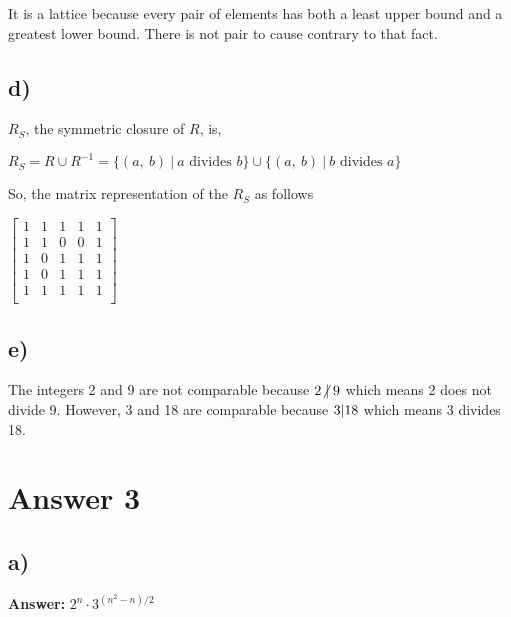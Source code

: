 \documentclass[12pt]{article}
\begin{document}
It is a lattice because every pair of elements has both a least upper bound and a greatest lower bound. There is not pair to cause contrary to that fact.

\subsection*{d)}

$R_S$, the symmetric closure of $R$, is,

$R_S = R \cup R^{-1} = \{(a,\ b)\ |\ a \text{ divides } b\} \cup \{(a,\ b)\ |\ b \text{ divides } a \}$

\noindent So, the matrix representation of the $R_S$ as follows

$\begin{bmatrix}
1 & 1 & 1 & 1 & 1\\
1 & 1 & 0 & 0 & 1\\
1 & 0 & 1 & 1 & 1\\
1 & 0 & 1 & 1 & 1\\
1 & 1 & 1 & 1 & 1\\
\end{bmatrix}$

\subsection*{e)}

The integers 2 and 9 are not comparable because $2 \centernot{|} 9$ which means 2 does not divide 9. However, 3 and 18 are comparable because $3 \centering{|} 18$ which means 3 divides 18.

\newpage
\section*{Answer 3}

\subsection*{a)} 

\textbf{Answer:} $2^n \cdot 3^{(n^2 - n)/2}$
\end{document}
